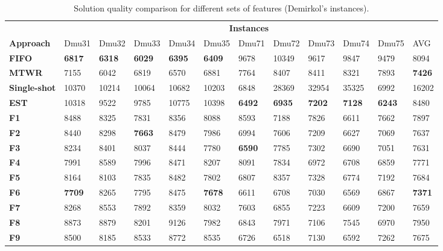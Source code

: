 \documentclass[runningheads]{llncs}
\begin{document}
\begin{table}[bt]
  \begin{center}
    \caption{Solution quality comparison for different sets of features (Demirkol's instances).}
    \label{tab5}

    \begin{tabular}{|l|l|l|l|l|l|l|l|l|l|l|l|} \hline
      & \multicolumn{11}{|c|}{\textbf{Instances}} \\ \cline{2-12}
      \textbf{Approach}  & Dmu31  & Dmu32 & Dmu33 & Dmu34 & Dmu35 & Dmu71 & Dmu72 & Dmu73 & Dmu74 & Dmu75 & AVG  \\ \hline

      \textbf{FIFO}  & \textbf{6817} & \textbf{6318} & \textbf{6029} & \textbf{6395} & \textbf{6409} & 9678 & 10349 & 9617 & 9847 & 9479 & 8094 \\
      \textbf{MTWR}  & 7155 & 6042 & 6819 & 6570 & 6881 & 7764 & 8407 & 8411 & 8321 & 7893 & \textbf{7426} \\
      \textbf{Single-shot} & 10370 & 10214 & 10064 & 10682 & 10203 & 6848 & 28369 & 32954 & 35325 & 6992 & 16202 \\
      \textbf{EST} & 10318  & 9522  & 9785 & 10775 & 10398 & \textbf{6492}  & \textbf{6935} & \textbf{7202} & \textbf{7128}  & \textbf{6243} & 8480 \\ \hline
      \textbf{F1}  & 8488  & 8325  & 7831 & 8356 & 8088 & 8593  & 7188 & 7826 & 6611 & 7662 & 7897 \\
      \textbf{F2}  & 8440  & 8298  & \textbf{7663} & 8479 & 7986 & 6994  & 7606 & 7209 & 6627 & 7069 & 7637 \\
      \textbf{F3}  & 8234  & 8401  & 8037 & 8444 & 7780 & \textbf{6590}  & 7785 & 7302 & 6690 & 7051 & 7631 \\
      \textbf{F4}  & 7991  & 8589  & 7996 & 8471 & 8207 & 8091  & 7834 & 6972 & 6708 & 6859 & 7771 \\
      \textbf{F5}  & 8164  & 8103  & 7835 & 8482 & 7802 & 6807  & 8357 & 7328 & 6774 & 7192 & 7684\\
      \textbf{F6}  & \textbf{7709} & 8265 & 7795 & 8475 & \textbf{7678}  & 6611 & 6708 & 7030 &6569 & 6867 & \textbf{7371} \\
      \textbf{F7}  & 8268  & 8553  & 7892 & 8359 & 8032 & 7603  & 6855 & 7223 & 6609 & 7200 & 7659 \\
      \textbf{F8}  & 8873 & 8879 & 8201 & 9126 & 7982 & 6843 & 7971 & 7106 & 7545 & 6970 & 7950 \\
      \textbf{F9}  & 8500  & 8185  & 8533 & 8772 & 8535 & 6726 & 6518& 7130 & 6592 & 7262 & 7675 \\

\end{tabular}
\end{center}
\end{table}
\end{document}
